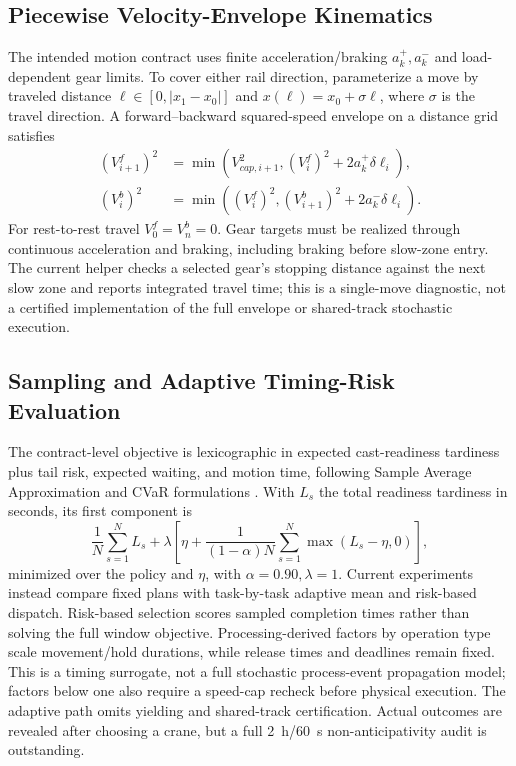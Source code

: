 \documentclass[11pt,a4paper]{article}
\begin{document}
\subsection{Piecewise Velocity-Envelope Kinematics}
The intended motion contract uses finite acceleration/braking $a_k^+,a_k^-$ and load-dependent gear limits. To cover either rail direction, parameterize a move by traveled distance $\ell\in[0,|x_1-x_0|]$ and $x(\ell)=x_0+\sigma\ell$, where $\sigma$ is the travel direction. A forward--backward squared-speed envelope on a distance grid satisfies
\begin{align}
 (V_{i+1}^{f})^2&=\min(V_{cap,i+1}^2,(V_i^f)^2+2a_k^+\delta\ell_i),\\
 (V_i^b)^2&=\min((V_i^f)^2,(V_{i+1}^b)^2+2a_k^-\delta\ell_i).
\end{align}
For rest-to-rest travel $V_0^f=V_n^b=0$. Gear targets must be realized through continuous acceleration and braking, including braking before slow-zone entry. The current helper checks a selected gear's stopping distance against the next slow zone and reports integrated travel time; this is a single-move diagnostic, not a certified implementation of the full envelope or shared-track stochastic execution.

\subsection{Sampling and Adaptive Timing-Risk Evaluation}
The contract-level objective is lexicographic in expected cast-readiness tardiness plus tail risk, expected waiting, and motion time, following Sample Average Approximation and CVaR formulations \cite{kleywegt2002sample,ye2014robust,rockafellar2000optimization}. With $L_s$ the total readiness tardiness in seconds, its first component is
\begin{equation}
 \frac{1}{N}\sum_{s=1}^N L_s+\lambda\left[\eta+\frac{1}{(1-\alpha)N}\sum_{s=1}^N\max(L_s-\eta,0)\right],
\end{equation}
minimized over the policy and $\eta$, with $\alpha=0.90,\lambda=1$. Current experiments instead compare fixed plans with task-by-task adaptive mean and risk-based dispatch. Risk-based selection scores sampled completion times rather than solving the full window objective. Processing-derived factors by operation type scale movement/hold durations, while release times and deadlines remain fixed. This is a timing surrogate, not a full stochastic process-event propagation model; factors below one also require a speed-cap recheck before physical execution. The adaptive path omits yielding and shared-track certification. Actual outcomes are revealed after choosing a crane, but a full 2~h/60~s non-anticipativity audit is outstanding.
\end{document}
